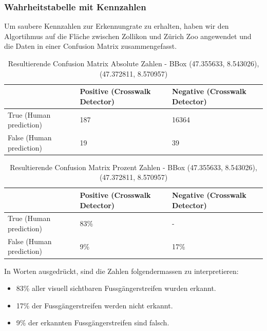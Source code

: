 \subsubsection{Wahrheitstabelle mit Kennzahlen}
Um saubere Kennzahlen zur Erkennungrate zu erhalten, haben wir den Algortihmus auf die Fläche zwischen Zollikon und Zürich Zoo angewendet und die Daten in einer Confusion Matrix zusammengefasst.
\\
\begin{table}[H]
	\centering
    \begin{tabular}{|l|l|l|}
    \hline    
        \rowcolor{lightblue} 
        & Positive (Crosswalk Detector) & Negative (Crosswalk Detector)  \\ \hline
     \cellcolor{lightblue}True (Human prediction) & 187 & 16364 \\ \hline
     \cellcolor{lightblue}False (Human prediction) & 19 & 39 \\ \hline
    \end{tabular}    
    \caption[Resultierende Confusion Matrix Absolute Zahlen]{Resultierende Confusion Matrix Absolute Zahlen - BBox (47.355633, 8.543026), (47.372811, 8.570957)}
\end{table}
\medskip
\begin{table}[H]
	\centering
    \begin{tabular}{|l|l|l|}
    \hline   
    \rowcolor{lightblue} 
     & Positive (Crosswalk Detector) & Negative (Crosswalk Detector)  \\ \hline
     \cellcolor{lightblue}True (Human prediction) & 83\% & - \\ \hline
     \cellcolor{lightblue}False (Human prediction) & 9\% & 17\% \\ \hline
    \end{tabular}    
    \caption[Resultierende Confusion Matrix Prozent Zahlen]{Resultierende Confusion Matrix Prozent Zahlen - BBox (47.355633, 8.543026), (47.372811, 8.570957)}
\end{table}


\newpage
In Worten ausgedrückt, sind die Zahlen folgendermassen zu interpretieren:
\begin{itemize}
	\item 83\% aller visuell sichtbaren Fussgängerstreifen wurden erkannt.
	\item 17\% der Fussgängerstreifen werden nicht erkannt.
	\item 9\% der erkannten Fussgängerstreifen sind falsch.
\end{itemize}
			



